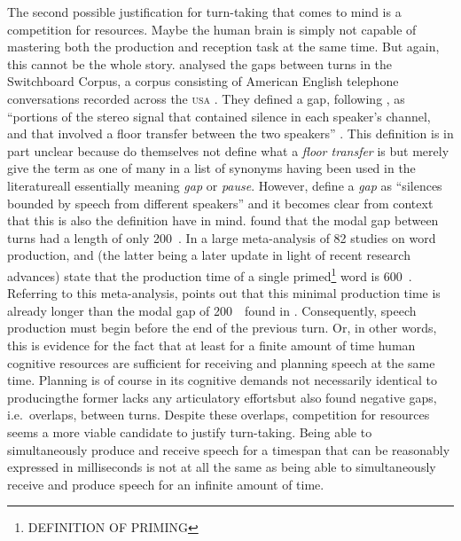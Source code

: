 The second possible justification for turn-taking that comes to mind is a competition for resources.
Maybe the human brain is simply not capable of mastering both the production and reception task at the same time.
But again, this cannot be the whole story.
\citet{levinson_timing_2015} analysed the gaps between turns in the Switchboard Corpus, a corpus consisting of American English telephone conversations recorded across the \textsc{usa} \citep{calhoun_nxt-format_2010,godfrey_switchboard_1992}.
They defined a gap, following \citet{heldner_pauses_2010}, as ``portions of the stereo signal that contained silence in each speaker's channel, and that involved a floor transfer between the two speakers'' \citep[]{levinson_timing_2015}.
This definition is in part unclear because \citet[]{heldner_pauses_2010} do themselves not define what a \emph{floor transfer} is but merely give the term as one of many in a list of synonyms having been used in the literature\dash all essentially meaning \emph{gap} or \emph{pause}.
However, \citet[]{heldner_pauses_2010} define a \emph{gap} as ``silences bounded by speech from different speakers'' and it becomes clear from context that this is also the definition \citet{levinson_timing_2015} have in mind.
\citet{levinson_timing_2015} found that the modal gap between turns had a length of only 200~\ms.
In a large meta-analysis of 82 studies on word production, \citet{indefrey_spatial_2004} and \citet{indefrey_spatial_2011} (the latter being a later update in light of recent research advances) state that the production time of a single primed\footnote{%
DEFINITION OF PRIMING}
word is 600~\ms.
Referring to this meta-analysis, \citet{levinson_turn-taking_2016} points out that this minimal production time is already longer than the modal gap of 200~\ms\ found in \citet{levinson_timing_2015}.
Consequently, speech production must begin before the end of the previous turn.
Or, in other words, this is evidence for the fact that at least for a finite amount of time human cognitive resources are sufficient for receiving and planning speech at the same time.
Planning is of course in its cognitive demands not necessarily identical to producing\dash the former lacks any articulatory efforts\dash but \citet{levinson_timing_2015} also found negative gaps, i.e.~overlaps, between turns.
Despite these overlaps, competition for resources seems a more viable candidate to justify turn-taking.
Being able to simultaneously produce and receive speech for a timespan that can be reasonably expressed in milliseconds is not at all the same as being able to simultaneously receive and produce speech for an infinite amount of time.

